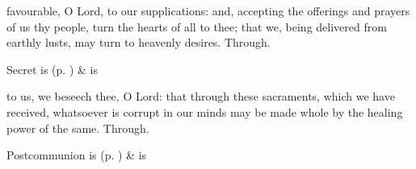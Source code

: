 
\secret
{} favourable, O Lord, to our supplications: and, accepting the offerings and prayers of us thy people, turn the hearts of all to thee; that we, being delivered from earthly lusts, may turn to heavenly desires. Through.

\begin{rubric}
     Secret is  (p. \pageref{SPSaints}) \&  is 
\end{rubric}


\postcommunion
{} to us, we beseech thee, O Lord: that through these sacraments, which we have received, whatsoever is corrupt in our minds may be made whole by the healing power of the same. Through.

\begin{rubric}
     Postcommunion is  (p. \pageref{SPSaints}) \&  is 
\end{rubric}